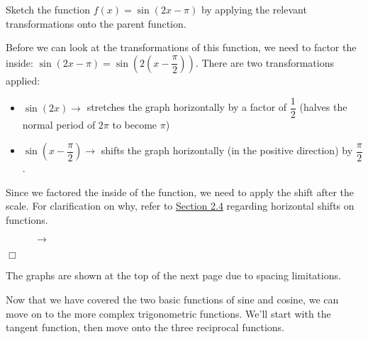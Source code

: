 \documentclass[lang=en,11pt]{elegantbook}
\begin{document}
\begin{example}
Sketch the function $f(x)=\sin(2x-\pi)$ by applying the relevant transformations onto the parent function.
\end{example}
\begin{solution}
Before we can look at the transformations of this function, we need to factor the inside: $\sin\left(2x-\pi\right)=\sin\left(2\left(x-\dfrac{\pi}{2}\right)\right)$. There are two transformations applied:\begin{itemize}
    \item $\sin(2x)\longrightarrow$ stretches the graph horizontally by a factor of $\dfrac{1}{2}$ (halves the normal period of $2\pi$ to become $\pi$)
    \item $\sin\left(x-\dfrac{\pi}{2}\right) \longrightarrow$ shifts the graph horizontally (in the positive direction) by $\dfrac{\pi}{2}$.
\end{itemize}
Since we factored the inside of the function, we need to apply the shift after the scale.  For clarification on why, refer to \hyperlink{section.2.4}{Section 2.4} regarding horizontal shifts on functions.
\begin{figure}[!h]
    \centering
      $\to$ 
\end{figure} $\Box$
\end{solution}
\begin{remark}
The graphs are shown at the top of the next page due to spacing limitations.
\end{remark}
Now that we have covered the two basic functions of sine and cosine, we can move on to the more complex trigonometric functions. We'll start with the tangent function, then move onto the three reciprocal functions.
\end{document}
